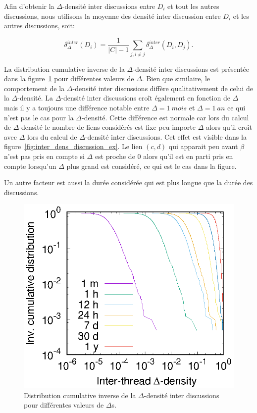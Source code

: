 Afin d'obtenir la $\Delta$-densité inter discussions entre $D_i$ et tout les autres discussions, nous utilisons la moyenne des densité inter discussion entre $D_i$ et les autres discussions, soit:

\begin{equation}
	\delta^{inter}_{\Delta}(D_i) = \frac{1}{|C|-1}\sum_{j,i\ne j} \delta^{inter}_{\Delta}(D_i,D_j).
\end{equation}

La distribution cumulative inverse de la $\Delta$-densité inter discussions est présentée dans la figure~\ref{fig:inter_dens_discussion} pour différentes valeurs de $\Delta$.
Bien que similaire, le comportement de la $\Delta$-densité inter discussions diffère qualitativement de celui de la $\Delta$-densité.
La $\Delta$-densité inter discussions croît également en fonction de $\Delta$ mais il y a toujours une différence notable entre $\Delta= 1\  mois$ et $\Delta= 1\ an$ ce qui n'est pas le cas pour la $\Delta$-densité.
Cette différence est normale car lors du calcul de $\Delta$-densité le nombre de liens considérés est fixe peu importe $\Delta$ alors qu'il croît avec $\Delta$ lors du calcul de $\Delta$-densité inter discussions.
Cet effet est visible dans la figure~\ref{fig:inter_dens_discussion_ex}.
Le lien $(c,d)$ qui apparait peu avant $\beta$ n'est pas pris en compte si $\Delta$ est proche de $0$ alors qu'il est en parti pris en compte lorsqu'un $\Delta$ plus grand est considéré, ce qui est le cas dans la figure.

Un autre facteur est aussi la durée considérée qui est plus longue que la durée des discussions.
\begin{figure}
\centering
	\includegraphics[width=0.48\linewidth]{img/mailing/inter_delta.eps}
\caption{Distribution cumulative inverse de la $\Delta$-densité inter discussions pour différentes valeurs de $\Delta$s.}
\label{fig:inter_dens_discussion}
\end{figure}


